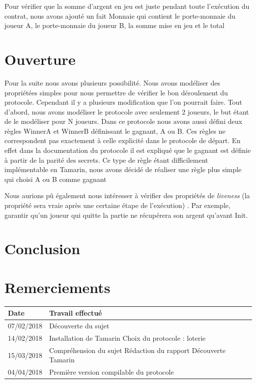 \documentclass[conference]{IEEEtran}
\begin{document}
Pour vérifier que la somme d'argent en jeu est juste pendant toute l'exécution du contrat, nous avons ajouté un fait Monnaie qui contient le porte-monnaie du joueur A, le porte-monnaie du joueur B, la somme mise en jeu et le total 

\section{Ouverture}
Pour la suite nous avons plusieurs possibilité. Nous avons modéliser des propriétées simples pour nous permettre de vérifier le bon déroulement du protocole. Cependant il y a plusieurs modification que l'on pourrait faire. Tout d'abord, nous avons modéliser le protocole avec seulement 2 joueurs, le but étant de le modéliser pour N joueurs. Dans ce protocole nous avons aussi défini deux règles WinnerA et WinnerB définissant le gagnant, A ou B. Ces règles ne correspondent pas exactement à celle explicité dans le protocole de départ. En effet dans la documentation du protocole il est expliqué que le gagnant est définie à partir de la parité des secrets. Ce type de règle étant difficilement implémentable en Tamarin, nous avons décidé de réaliser une règle plus simple qui choisi A ou B comme gagnant

Nous aurions pû également nous intéresser à vérifier des propriétés de \textit{liveness} (la propriété sera vraie après une certaine étape de l'exécution) \cite{vivacite}.
Par exemple, garantir qu'un joueur qui quitte la partie ne récupérera son argent qu'avant Init.


\section{Conclusion}

\section{Remerciements}

\newpage




\newpage
\begin{tabular}{|m{3cm}|m{7cm}}
\hline
\rowcolor{grey!40} \textbf{Date} & \textbf{Travail effectué}  \\ 
\hline 
\rowcolor{grey!10}  07/02/2018 & Découverte du sujet \\
\hline
\rowcolor{grey!10}  14/02/2018 & Installation de Tamarin \newline Choix du protocole : loterie \\
\hline
\rowcolor{grey!10}  15/03/2018 & Compréhension du sujet \newline Rédaction du rapport \newline Découverte Tamarin \\
\hline
\rowcolor{grey!10}  04/04/2018 & Première version compilable du protocole \\
\end{tabular}
\end{document}
